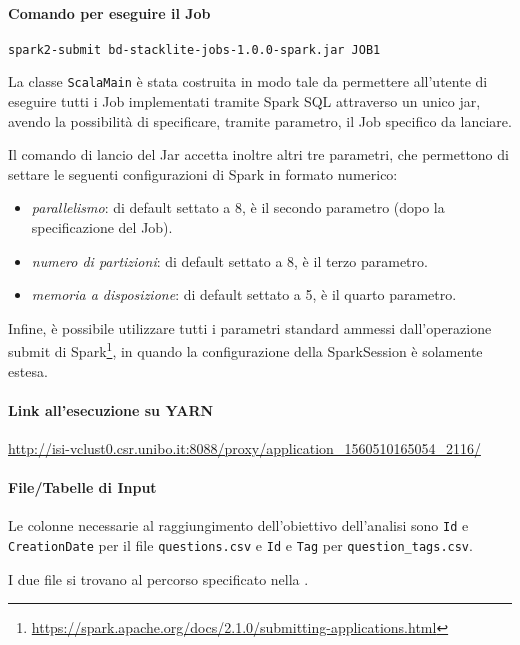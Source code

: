   \paragraph{Comando per eseguire il Job}\label{par:job1:spark:cmd}

  \texttt{spark2-submit bd-stacklite-jobs-1.0.0-spark.jar JOB1}

  La classe \texttt{ScalaMain} è stata costruita in modo tale da permettere all'utente di eseguire tutti i Job implementati tramite
  Spark SQL attraverso un unico jar, avendo la possibilità di specificare, tramite parametro, il Job specifico da lanciare.

  Il comando di lancio del Jar accetta inoltre altri tre parametri, che permettono di settare le seguenti configurazioni di Spark in formato numerico:
  \begin{itemize}
    \item \textit{parallelismo}: di default settato a 8, è il secondo parametro (dopo la specificazione del Job).
    \item \textit{numero di partizioni}: di default settato a 8, è il terzo parametro.
    \item \textit{memoria a disposizione}: di default settato a 5, è il quarto parametro.
  \end{itemize}

  Infine, è possibile utilizzare tutti i parametri standard ammessi dall'operazione submit di Spark\footnote{\url{https://spark.apache.org/docs/2.1.0/submitting-applications.html}},
  in quando la configurazione della SparkSession è solamente estesa.

  \paragraph{Link all'esecuzione su YARN}\label{par:job1:spark:yarn}

  \url{http://isi-vclust0.csr.unibo.it:8088/proxy/application_1560510165054_2116/}

  \paragraph{File/Tabelle di Input}\label{par:job1:spark:input}

  Le colonne necessarie al raggiungimento dell'obiettivo dell'analisi sono \texttt{Id} e \texttt{CreationDate} per il file \texttt{questions.csv}
  e \texttt{Id} e \texttt{Tag} per \texttt{question\_tags.csv}.

  I due file si trovano al percorso specificato nella .

